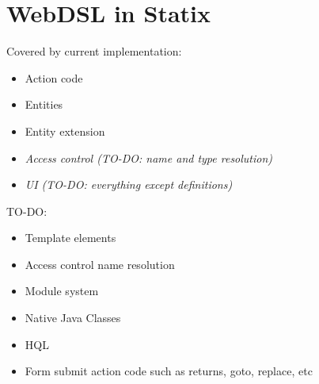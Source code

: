 
\chapter{\label{chap:statix}WebDSL in Statix}

  \autocite{HEMEL2011150}


  Covered by current implementation:
  \begin{itemize}
    \item Action code
    \item Entities
    \item Entity extension
    \item \emph{Access control (TO-DO: name and type resolution)}
    \item \emph{UI (TO-DO: everything except definitions)}
  \end{itemize}

  TO-DO:
  \begin{itemize}
    \item Template elements
    \item Access control name resolution
    \item Module system
    \item Native Java Classes
    \item HQL
    \item Form submit action code such as returns, goto, replace, etc
  \end{itemize}
